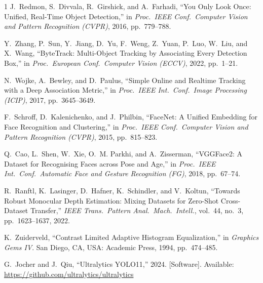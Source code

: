 \documentclass[conference]{IEEEtran}
\begin{document}
\begin{thebibliography}{1}
J.~Redmon, S.~Divvala, R.~Girshick, and A.~Farhadi, ``You Only Look
Once: Unified, Real-Time Object Detection,'' in \emph{Proc.\ IEEE Conf.\
Computer Vision and Pattern Recognition (CVPR)}, 2016, pp.~779--788.

Y.~Zhang, P.~Sun, Y.~Jiang, D.~Yu, F.~Weng, Z.~Yuan, P.~Luo, W.~Liu, and
X.~Wang, ``ByteTrack: Multi-Object Tracking by Associating Every
Detection Box,'' in \emph{Proc.\ European Conf.\ Computer Vision
(ECCV)}, 2022, pp.~1--21.

N.~Wojke, A.~Bewley, and D.~Paulus, ``Simple Online and Realtime
Tracking with a Deep Association Metric,'' in \emph{Proc.\ IEEE Int.\
Conf.\ Image Processing (ICIP)}, 2017, pp.~3645--3649.

F.~Schroff, D.~Kalenichenko, and J.~Philbin, ``FaceNet: A Unified
Embedding for Face Recognition and Clustering,'' in \emph{Proc.\ IEEE
Conf.\ Computer Vision and Pattern Recognition (CVPR)}, 2015,
pp.~815--823.

Q.~Cao, L.~Shen, W.~Xie, O.~M. Parkhi, and A.~Zisserman, ``VGGFace2: A
Dataset for Recognising Faces across Pose and Age,'' in \emph{Proc.\
IEEE Int.\ Conf.\ Automatic Face and Gesture Recognition (FG)}, 2018,
pp.~67--74.

\bibitem{midas}
R.~Ranftl, K.~Lasinger, D.~Hafner, K.~Schindler, and V.~Koltun,
``Towards Robust Monocular Depth Estimation: Mixing Datasets for
Zero-Shot Cross-Dataset Transfer,'' \emph{IEEE Trans.\ Pattern Anal.\
Mach.\ Intell.}, vol.~44, no.~3, pp.~1623--1637, 2022.

\bibitem{clahe}
K.~Zuiderveld, ``Contrast Limited Adaptive Histogram Equalization,'' in
\emph{Graphics Gems IV}. San Diego, CA, USA: Academic Press, 1994,
pp.~474--485.

\bibitem{ultralytics}
G.~Jocher and J.~Qiu, ``Ultralytics YOLO11,'' 2024. [Software].
Available: \url{https://github.com/ultralytics/ultralytics}

\end{thebibliography}
\end{document}
